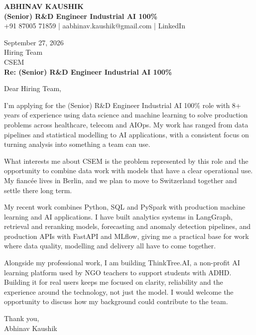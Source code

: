 \documentclass[10pt,a4paper]{article}
\begin{document}
\begin{center}
{\Large\bfseries ABHINAV KAUSHIK}\\[2pt]
{\bfseries (Senior) R\&D Engineer Industrial AI 100\%}\\[2pt]
+91 87005 71859 \quad | \quad aabhinav.kaushik@gmail.com \quad | \quad LinkedIn
\end{center}
\vspace{8pt}
September 27, 2026\\[6pt]
Hiring Team\\
CSEM\\[4pt]
\textbf{Re: (Senior) R\&D Engineer Industrial AI 100\%}

Dear Hiring Team,

I’m applying for the (Senior) R\&D Engineer Industrial AI 100\% role with 8+ years of experience using data science and machine learning to solve production problems across healthcare, telecom and AIOps. My work has ranged from data pipelines and statistical modelling to AI applications, with a consistent focus on turning analysis into something a team can use.

What interests me about CSEM is the problem represented by this role and the opportunity to combine data work with models that have a clear operational use. My fiancée lives in Berlin, and we plan to move to Switzerland together and settle there long term.

My recent work combines Python, SQL and PySpark with production machine learning and AI applications. I have built analytics systems in LangGraph, retrieval and reranking models, forecasting and anomaly detection pipelines, and production APIs with FastAPI and MLflow, giving me a practical base for work where data quality, modelling and delivery all have to come together.

Alongside my professional work, I am building ThinkTree.AI, a non-profit AI learning platform used by NGO teachers to support students with ADHD. Building it for real users keeps me focused on clarity, reliability and the experience around the technology, not just the model. I would welcome the opportunity to discuss how my background could contribute to the team.

Thank you,\\
Abhinav Kaushik
\end{document}
